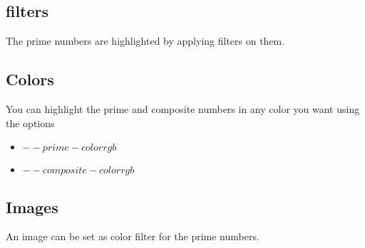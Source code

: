 \subsection{filters}
 The prime numbers are highlighted by applying filters on them.

 \subsection{Colors}
 You can highlight the prime and composite numbers in any color you want using the options

 \begin{itemize}
	\item{$--prime-color r g b$}
	\item{$--composite-color r g b$}
\end{itemize}

\subsection{Images}
An image can be set as color filter for the prime numbers.  
